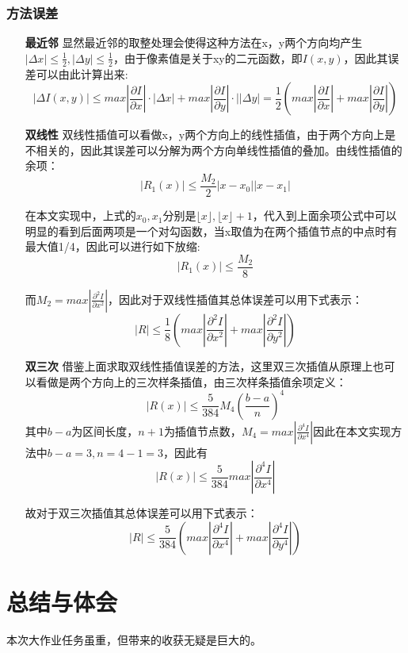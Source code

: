 \documentclass[UTF8]{ctexart}
\begin{document}
\subsubsection{方法误差}
\begin{itemize}
\item [\textbf{最近邻}]
显然最近邻的取整处理会使得这种方法在x，y两个方向均产生$|\Delta x|\leq \frac{1}{2},|\Delta y|\leq \frac{1}{2}$，由于像素值是关于xy的二元函数，即$I(x,y)$，因此其误差可以由此计算出来:
$$|\Delta I(x,y)| \leq max|\frac{\partial I}{\partial x}|\cdot|\Delta x| + max|\frac{\partial I}{\partial y}|\cdot||\Delta y| = \frac{1}{2}(max|\frac{\partial I}{\partial x}|+max|\frac{\partial I}{\partial y}|)$$
\item [\textbf{双线性}]
双线性插值可以看做x，y两个方向上的线性插值，由于两个方向上是不相关的，因此其误差可以分解为两个方向单线性插值的叠加。由线性插值的余项：
$$|R_1(x)|\leq \frac{M_2}{2} |x-x_0||x-x_1|$$

在本文实现中，上式的$x_0,x_1$分别是$\lfloor x \rfloor, \lfloor x \rfloor+ 1$，代入到上面余项公式中可以明显的看到后面两项是一个对勾函数，当x取值为在两个插值节点的中点时有最大值1/4，因此可以进行如下放缩:
$$|R_1(x)|\leq \frac{M_2}{8}$$

而$M_2 = max|\frac{\partial^2I}{\partial x^2}|$，因此对于双线性插值其总体误差可以用下式表示：
\begin{equation}
    |R| \leq \frac{1}{8}(max|\frac{\partial^2 I}{\partial x^2}|+max|\frac{\partial^2 I}{\partial y^2}|)
\end{equation}

\item [\textbf{双三次}]
借鉴上面求取双线性插值误差的方法，这里双三次插值从原理上也可以看做是两个方向上的三次样条插值，由三次样条插值余项定义：
$$|R(x)|\leq \frac{5}{384} M_4(\frac{b-a}{n})^4$$其中$b-a$为区间长度，$n+1$为插值节点数，$M_4=max|\frac{\partial^4 I}{\partial x^4}|$因此在本文实现方法中$b-a=3,n=4-1=3$，因此有$$|R(x)|\leq \frac{5}{384}max|\frac{\partial^4 I}{\partial x^4}|$$

故对于双三次插值其总体误差可以用下式表示：
\begin{equation}
    |R| \leq \frac{5}{384}(max|\frac{\partial^4 I}{\partial x^4}|+max|\frac{\partial^4 I}{\partial y^4}|)
\end{equation}
\end{itemize}
\section{总结与体会}
本次大作业任务虽重，但带来的收获无疑是巨大的。
\end{document}
